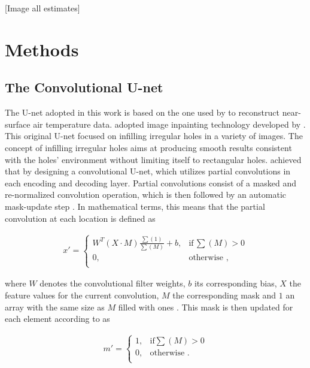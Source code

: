 \documentclass[Masterarbeit.tex]{subfile}
\begin{document}
	
	[Image all estimates]
	
	
	\section{Methods}
	
	\subsection{The Convolutional U-net} \label{method:unet}
	
	The U-net adopted in this work is based on the one used by \cite{kadow_artificial_2020} to reconstruct near-surface air temperature data. \cite{kadow_artificial_2020} adopted image inpainting technology developed by \cite{liu_image_2018}. This original U-net focused on infilling irregular holes in a variety of images. The concept of infilling irregular holes aims at producing smooth results consistent with the holes' environment without limiting itself to rectangular holes. \cite{liu_image_2018} achieved that by designing a convolutional U-net, which utilizes partial convolutions in each encoding and decoding layer. Partial convolutions consist of a masked and re-normalized convolution operation, which is then followed by an automatic mask-update step \citep{liu_image_2018}. In mathematical terms, this means that the partial convolution at each location is defined as
	
	\begin{align}
	x' = \begin{cases}
	W^{T} (X \cdot M) \frac{\sum(1)}{\sum(M)} + b, &\text{if} \, \sum(M) > 0\\
	0, &\text{otherwise ,}\\
	\end{cases}
	\end{align}
	
	where $W$ denotes the convolutional filter weights, $b$ its corresponding bias, $X$ the feature values for the current convolution, $M$ the corresponding mask and $1$ an array with the same size as $M$ filled with ones \cite{liu_image_2018}. This mask is then updated for each element according to \cite{liu_image_2018} as
	
	\begin{align}
	m' = \begin{cases}
	1, & \text{if} \sum(M) > 0 \\
	0, & \text{otherwise .} \\
	\end{cases}
	\end{align}
	
\end{document}
